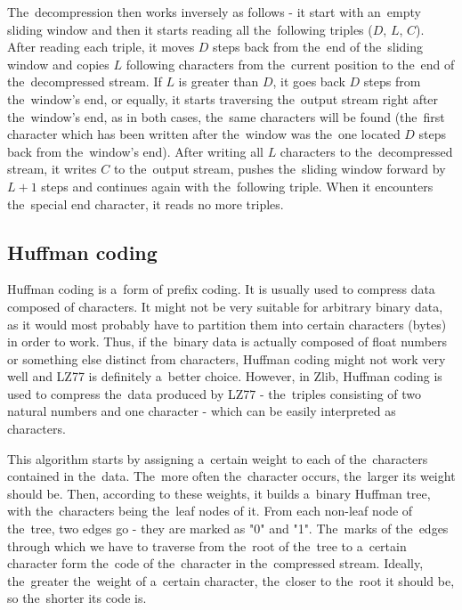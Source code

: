 The~decompression then works inversely as follows - it start with an~empty sliding window and then it starts reading all the~following triples ($D$, $L$, $C$). After reading each triple, it moves $D$ steps back from the~end of the~sliding window and copies $L$ following characters from the~current position to the~end of the~decompressed stream. If $L$ is greater than $D$, it goes back $D$ steps from the~window's end, or equally, it starts traversing the~output stream right after the~window's end, as in both cases, the~same characters will be found (the~first character which has been written after the~window was the~one located $D$ steps back from the~window's end). After writing all $L$ characters to the~decompressed stream, it writes $C$ to the~output stream, pushes the~sliding window forward by $L + 1$ steps and continues again with the~following triple. When it encounters the~special end character, it reads no more triples.

\subsection{Huffman coding}\label{subsec:huffman}

Huffman coding is a~form of prefix coding. It is usually used to compress data composed of characters. It might not be very suitable for arbitrary binary data, as it would most probably have to partition them into certain characters (bytes) in order to work. Thus, if the~binary data is actually composed of float numbers or something else distinct from characters, Huffman coding might not work very well and LZ77 is definitely a~better choice. However, in Zlib, Huffman coding is used to compress the~data produced by LZ77 - the~triples consisting of two natural numbers and one character - which can be easily interpreted as characters.

This algorithm starts by assigning a~certain weight to each of the~characters contained in the~data. The~more often the~character occurs, the~larger its weight should be. Then, according to these weights, it builds a~binary Huffman tree, with the~characters being the~leaf nodes of it. From each non-leaf node of the~tree, two edges go - they are marked as "0" and "1". The~marks of the~edges through which we have to traverse from the~root of the~tree to a~certain character form the~code of the~character in the~compressed stream. Ideally, the~greater the~weight of a~certain character, the~closer to the~root it should be, so the~shorter its code is.


